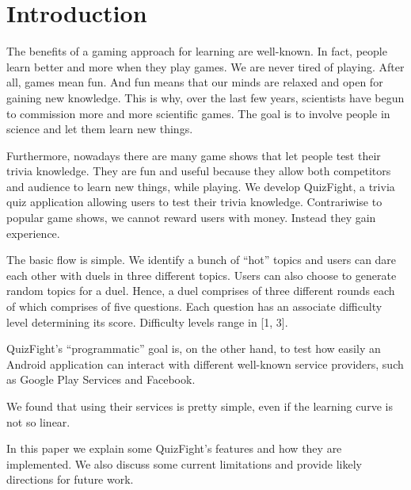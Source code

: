 \section{Introduction}

The benefits of a gaming approach for learning are well-known. In fact,
people learn better and more when they play games. We are never tired of
playing.
After all, games mean fun. And fun means that our minds are relaxed and open
for gaining new knowledge.
This is why, over the last few years, scientists have begun to commission
more and more scientific games.
The goal is to involve people in science and let them learn new things.

Furthermore, nowadays there are many game shows that let people test their
trivia knowledge.
They are fun and useful because they allow both competitors and audience to
learn new things, while playing.
We develop QuizFight, a trivia quiz application allowing users to test their
trivia knowledge.
Contrariwise to popular game shows, we cannot reward users with money.
Instead they gain experience. 

The basic flow is simple. We identify a bunch of ``hot'' topics and users can
dare each other with duels in three different topics.
Users can also choose to generate random topics for a duel.
Hence, a duel comprises of three different rounds each of which comprises
of five questions.
Each question has an associate difficulty level determining its score.
Difficulty levels range in [1, 3].

QuizFight's ``programmatic'' goal is, on the other hand, to test how easily an
Android application can interact with different well-known service providers,
such as Google Play Services and Facebook.

We found that using their services is pretty simple, even if the learning curve
is not so linear.

In this paper we explain some QuizFight's features and how they are
implemented.
We also discuss some current limitations and provide likely directions for
future work. 

